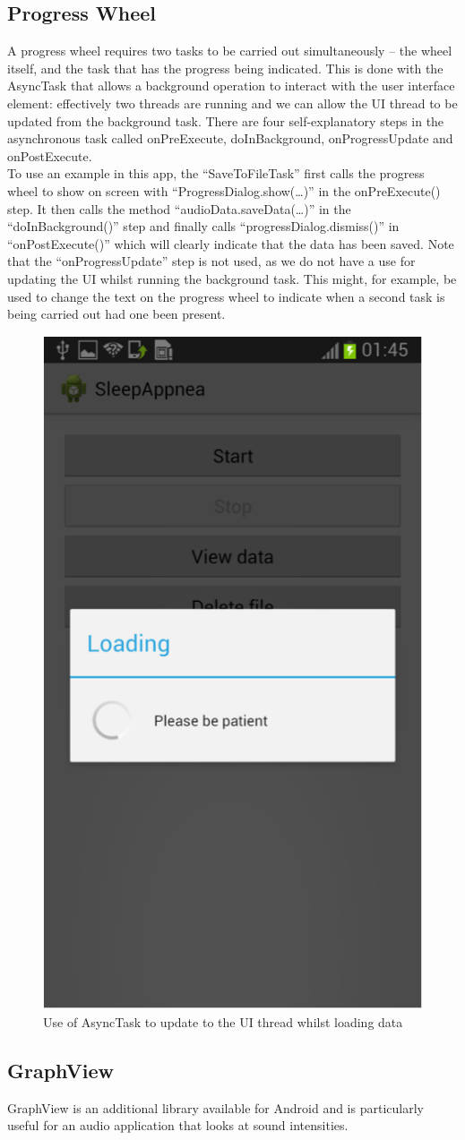 \subsection{Progress Wheel}
A progress wheel requires two tasks to be carried out simultaneously – the wheel itself, and the task that has the progress being indicated. This is done with the AsyncTask that allows a background operation to interact with the user interface element: effectively two threads are running and we can allow the UI thread to be updated from the background task. There are four self-explanatory steps in the asynchronous task called onPreExecute, doInBackground, onProgressUpdate and onPostExecute.
\\ To use an example in this app, the ``SaveToFileTask'' first calls the progress wheel to show on screen with ``ProgressDialog.show(…)'' in the onPreExecute() step. It then calls the method ``audioData.saveData(…)'' in the ``doInBackground()'' step and finally calls ``progressDialog.dismiss()'' in ``onPostExecute()'' which will clearly indicate that the data has been saved. Note that the ``onProgressUpdate'' step is not used, as we do not have a use for updating the UI whilst running the background task. This might, for example, be used to change the text on the progress wheel to indicate when a second task is being carried out had one been present.
\begin{figure}[ht!]
		\centering
			\includegraphics[width=.4\textwidth]{drawings/Loading.png}
		\caption{Use of AsyncTask to update to the UI thread whilst loading data}
		\label{fig:loadingData}
	\end{figure}
\subsection{GraphView}
GraphView is an additional library available for Android and is particularly useful for an audio application that looks at sound intensities. 

